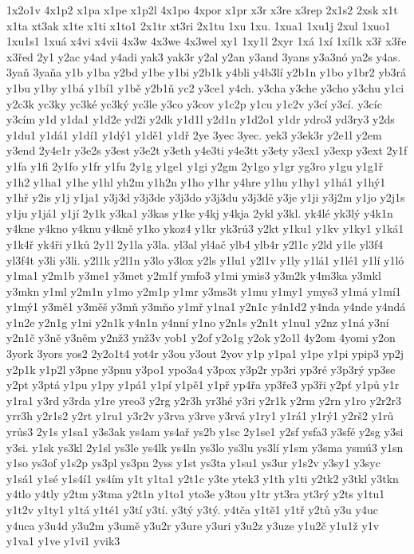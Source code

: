 {1x2o1v
4x1p2
x1pa
x1pe
x1p2l
4x1po
4xpor
x1pr
x3r
x3re
x3rep
2x1s2
2xsk
x1t
x1ta
xt3ak
x1te
x1ti
x1to1
2x1tr
xt3ri
2x1tu
1xu
1xu.
1xua1
1xu1j
2xul
1xuo1
1xu1s1
1xuá
x4vi
x4vii
4x3w
4x3we
4x3wel
xy1
1xy1l
2xyr
1xá
1xí
1xí1k
x3ř
x3ře
x3řed
2y1
y2ac
y4ad
y4adi
yak3
yak3r
y2al
y2an
y3and
3yans
y3a3nó
ya2s
y4as.
3yaň
3yaňa
y1b
y1ba
y2bd
y1be
y1bi
y2b1k
y4bli
y4b3lí
y2b1n
y1bo
y1br2
yb3rá
y1bu
y1by
y1bá
y1bí1
y1bě
y2b1ň
yc2
y3ce1
y4ch.
y3cha
y3che
y3cho
y3chu
y1ci
y2c3k
yc3ky
yc3ké
yc3ký
yc3le
y3co
y3cov
y1c2p
y1cu
y1c2v
y3cí
y3cí.
y3cíc
y3cím
y1d
y1da1
y1d2e
yd2i
y2dk
y1d1l
y2d1n
y1d2o1
y1dr
ydro3
yd3ry3
y2ds
y1du1
y1dá1
y1dí1
y1dý1
y1dě1
y1dř
2ye
3yec
3yec.
yek3
y3ek3r
y2e1l
y2em
y3end
2y4e1r
y3e2s
y3est
y3e2t
y3eth
y4e3ti
y4e3tt
y3ety
y3ex1
y3exp
y3ext
2y1f
y1fa
y1fi
2y1fo
y1fr
y1fu
2y1g
y1ge1
y1gi
y2gm
2y1go
y1gr
yg3ro
y1gu
y1g1ř
y1h2
y1ha1
y1he
y1hl
yh2m
y1h2n
y1ho
y1hr
y4hre
y1hu
y1hy1
y1há1
y1hý1
y1hř
y2is
y1j
y1ja1
y3j3d
y3j3de
y3j3do
y3j3du
y3j3dě
y3je
y1ji
y3j2m
y1jo
y2j1s
y1ju
y1já1
y1jí
2y1k
y3ka1
y3kas
y1ke
y4kj
y4kja
2ykl
y3kl.
yk4lé
yk3lý
y4k1n
y4kne
y4kno
y4knu
y4kně
y1ko
ykoz4
y1kr
yk3rú3
y2kt
y1ku1
y1kv
y1ky1
y1ká1
y1k4ř
yk4ři
y1ků
2y1l
2y1la
y3la.
yl3al
yl4ač
ylb4
ylb4r
y2l1c
y2ld
y1le
yl3f4
yl3f4t
y3li
y3li.
y2l1k
y2l1n
y3lo
y3lox
y2ls
y1lu1
y2l1v
y1ly
y1lá1
y1lé1
y1lí
y1ló
y1ma1
y2m1b
y3me1
y3met
y2m1f
ymfo3
y1mi
ymis3
y3m2k
y4m3ka
y3mkl
y3mkn
y1ml
y2m1n
y1mo
y2m1p
y1mr
y3ms3t
y1mu
y1my1
ymys3
y1má
y1mí1
y1mý1
y3mě1
y3měš
y3mň
y3mňo
y1mř
y1na1
y2n1c
y4n1d2
y4nda
y4nde
y4ndá
y1n2e
y2n1g
y1ni
y2n1k
y4n1n
y4nní
y1no
y2n1s
y2n1t
y1nu1
y2nz
y1ná
y3ní
y2n1č
y3ně
y3něm
y2nž3
ynž3v
yob1
y2of
y2o1g
y2ok
y2o1l
4y2om
4yomi
y2on
3york
3yors
yos2
2y2o1t4
yot4r
y3ou
y3out
2yov
y1p
y1pa1
y1pe
y1pi
ypip3
yp2j
y2p1k
y1p2l
y3pne
y3pnu
y3po1
ypo3a4
y3pox
y3p2r
yp3ri
yp3ré
y3p3rý
yp3se
y2pt
y3ptá
y1pu
y1py
y1pá1
y1pí
y1pě1
y1př
yp4řa
yp3ře3
yp3ři
y2pť
y1pů
y1r
y1ra1
y3rd
y3rda
y1re
yreo3
y2rg
y2r3h
yr3hé
y3ri
y2r1k
y2rm
y2rn
y1ro
y2r2r3
yrr3h
y2r1s2
y2rt
y1ru1
y3r2v
y3rva
y3rve
y3rvá
y1ry1
y1rá1
y1rý1
y2rš2
y1rů
yrůs3
2y1s
y1sa1
y3s3ak
ys4am
ys4ař
ys2b
y1sc
2y1se1
y2sf
ysfa3
y3sfé
y2sg
y3si
y3si.
y1sk
ys3kl
2y1sl
ys3le
ys4lk
ys4ln
ys3lo
ys3lu
ys3lí
y1sm
y3sma
ysmú3
y1sn
y1so
ys3of
y1s2p
ys3pl
ys3pn
2yss
y1st
ys3ta
y1su1
ys3ur
y1s2v
y3sy1
y3syc
y1sá1
y1sé
y1s4í1
ys4ím
y1t
y1ta1
y2t1c
y3te
ytek3
y1th
y1ti
y2tk2
y3tkl
y3tkn
y4tlo
y4tly
y2tm
y3tma
y2t1n
y1to1
yto3e
y3tou
y1tr
yt3ra
yt3rý
y2ts
y1tu1
y1t2v
y1ty1
y1tá
y1té1
y3tí
y3tí.
y3tý
y3tý.
y4tča
y1tě1
y1tř
y2tů
y3u
y4uc
y4uca
y3u4d
y3u2m
y3umě
y3u2r
y3ure
y3uri
y3u2z
y3uze
y1u2č
y1u1ž
y1v
y1va1
y1ve
y1vi1
yvik3
}

